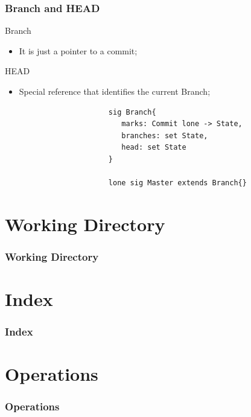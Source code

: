 \documentclass{beamer}
\begin{document}
\begin{frame}[fragile]
\frametitle{Branch and HEAD}
   \begin{block}{Branch}
      \begin{itemize}
         \item It is just a pointer to a commit;
      \end{itemize}
   \end{block}
   \begin{block}{HEAD}
      \begin{itemize} 
         \item Special reference that identifies the current Branch;
      \end{itemize}
   \end{block}
   \tiny
   \color{blue}
   \begin{lstlisting}
                        sig Branch{
                           marks: Commit lone -> State,
                           branches: set State,
                           head: set State
                        }

                        lone sig Master extends Branch{}
   \end{lstlisting}
\end{frame}


\section{Working Directory}
\begin{frame}
   \frametitle{Working Directory}
\end{frame}

\section{Index}
\begin{frame}
   \frametitle{Index}
\end{frame}

\section{Operations}
\begin{frame}
   \frametitle{Operations}
\end{frame}
\end{document}
